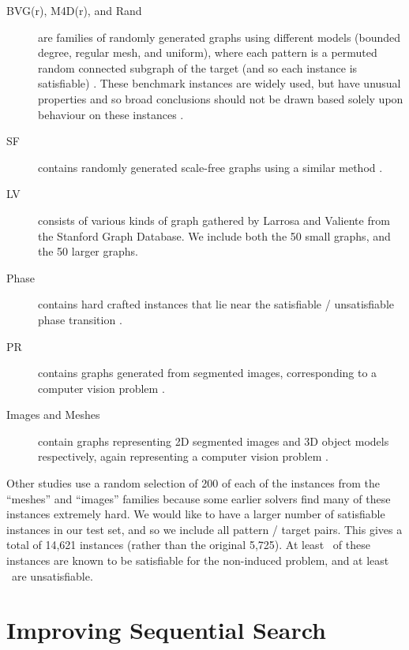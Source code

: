 \documentclass[runningheads]{llncs}
\begin{document}
\begin{description}
    \item[BVG(r), M4D(r), and Rand] are families of randomly generated graphs using different models (bounded
        degree, regular mesh, and uniform), where each pattern is a permuted random connected subgraph
        of the target (and so each instance is satisfiable) \cite{DBLP:journals/pami/CordellaFSV04}.
        These benchmark instances are widely used, but have unusual properties and so broad
        conclusions should not be drawn based solely upon behaviour on these instances
        \cite{DBLP:journals/jair/McCreeshPST18}.
    \item[SF] contains randomly generated scale-free graphs using a similar method
        \cite{DBLP:journals/constraints/ZampelliDS10}.
   \item[LV] consists of various kinds of graph gathered by Larrosa and Valiente
       \cite{DBLP:journals/mscs/LarrosaV02} from the Stanford Graph Database. We include both the
        50 small graphs, and the 50 larger graphs.
    \item[Phase] contains hard crafted instances that lie near the satisfiable / unsatisfiable phase
        transition \cite{DBLP:journals/jair/McCreeshPST18}.
    \item[PR] contains graphs generated from segmented images, corresponding to a computer vision
        problem \cite{DBLP:journals/pr/SolnonDHJ15}.
    \item[Images and Meshes] contain graphs representing 2D segmented images and 3D object models
        respectively, again representing a computer vision problem
        \cite{DBLP:journals/cviu/DamiandSHJS11}.
\end{description}

\noindent
Other studies use a random selection of 200 of each of the instances from the ``meshes'' and
``images'' families because some earlier solvers find many of these instances extremely hard. We
would like to have a larger number of satisfiable instances in our test set, and so we include all
pattern / target pairs. This gives a total of 14,621 instances (rather than the original 5,725). At
least \unskip\ of these instances are known to be satisfiable for the
non-induced problem, and at least \unskip\ are unsatisfiable.

\section{Improving Sequential Search}
\end{document}
